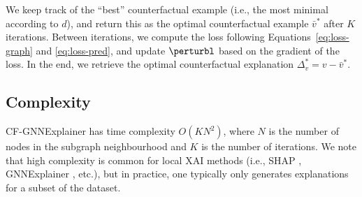 We keep track of the ``best'' counterfactual example (i.e., the most minimal according to $d$), and return this as the optimal counterfactual example $\bar{v}^*$ after $K$ iterations. 
Between iterations, we compute the loss following Equations~\ref{eq:loss-graph} and \ref{eq:loss-pred}, and update $\perturbl$ based on the gradient of the loss. 
In the end, we retrieve the optimal counterfactual explanation $\Delta_v^* = v - \bar{v}^* $. 

\subsection{Complexity}
\label{section:complexity}
CF-GNNExplainer has time complexity $O(KN^2)$, where $N$ is the number of nodes in the subgraph neighbourhood and $K$ is the number of iterations. We note that high complexity is common for local XAI methods (i.e., SHAP \citep{lundberg_unified_2017}, GNNExplainer \citep{ying_gnnexplainer_2019}, etc.), but in practice, one typically only generates explanations for a subset of the dataset. 


